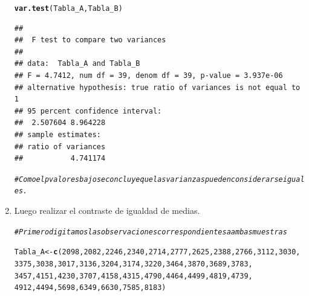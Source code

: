 \documentclass[12pt,letterpaper]{article}\usepackage[]{graphicx}\usepackage[]{color}
\makeatletter
\newcommand{\hlnum}[1]{\textcolor[rgb]{0.686,0.059,0.569}{#1}}%
\newcommand{\hlcom}[1]{\textcolor[rgb]{0.678,0.584,0.686}{\textit{#1}}}%
\newcommand{\hlstd}[1]{\textcolor[rgb]{0.345,0.345,0.345}{#1}}%
\newcommand{\hlkwb}[1]{\textcolor[rgb]{0.69,0.353,0.396}{#1}}%
\newcommand{\hlkwd}[1]{\textcolor[rgb]{0.737,0.353,0.396}{\textbf{#1}}}%
\newenvironment{kframe}{%
 \def\at@end@of@kframe{}%
 \ifinner\ifhmode%
  \def\at@end@of@kframe{\end{minipage}}%
  \begin{minipage}{\columnwidth}%
 \fi\fi%
 \def\FrameCommand##1{\hskip\@totalleftmargin \hskip-\fboxsep
 \colorbox{shadecolor}{##1}\hskip-\fboxsep
     \hskip-\linewidth \hskip-\@totalleftmargin \hskip\columnwidth}%
 \MakeFramed {\advance\hsize-\width
   \@totalleftmargin\z@ \linewidth\hsize
   \@setminipage}}%
 {\par\unskip\endMakeFramed%
 \at@end@of@kframe}
\newenvironment{knitrout}{}{} %
\makeatother
\begin{document}
\begin{enumerate}
\begin{knitrout}
\begin{kframe}
\begin{alltt}
\hlkwd{var.test}\hlstd{(Tabla_A, Tabla_B)}
\end{alltt}
\begin{verbatim}
## 
## 	F test to compare two variances
## 
## data:  Tabla_A and Tabla_B
## F = 4.7412, num df = 39, denom df = 39, p-value = 3.937e-06
## alternative hypothesis: true ratio of variances is not equal to 1
## 95 percent confidence interval:
##  2.507604 8.964228
## sample estimates:
## ratio of variances 
##           4.741174
\end{verbatim}
\begin{alltt}
\hlcom{# Como el p valor es bajo se concluye que las varianzas pueden considerarse iguales. }
\end{alltt}
\end{kframe}
\end{knitrout}

\item Luego realizar el contraste de igualdad de medias.

\begin{knitrout}
\color{fgcolor}\begin{kframe}
\begin{alltt}
\hlcom{# Primero digitamos las observaciones correspondientes a ambas muestras }

\hlstd{Tabla_A} \hlkwb{<-} \hlkwd{c}\hlstd{(}\hlnum{2098}\hlstd{,} \hlnum{2082}\hlstd{,} \hlnum{2246}\hlstd{,} \hlnum{2340}\hlstd{,} \hlnum{2714}\hlstd{,} \hlnum{2777}\hlstd{,} \hlnum{2625}\hlstd{,} \hlnum{2388}\hlstd{,} \hlnum{2766}\hlstd{,} \hlnum{3112}\hlstd{,} \hlnum{3030}\hlstd{,}
             \hlnum{3375}\hlstd{,} \hlnum{3038}\hlstd{,} \hlnum{3017}\hlstd{,} \hlnum{3136}\hlstd{,} \hlnum{3204}\hlstd{,} \hlnum{3174}\hlstd{,} \hlnum{3220}\hlstd{,} \hlnum{3464}\hlstd{,} \hlnum{3870}\hlstd{,} \hlnum{3689}\hlstd{,} \hlnum{3783}\hlstd{,}
             \hlnum{3457}\hlstd{,} \hlnum{4151}\hlstd{,} \hlnum{4230}\hlstd{,} \hlnum{3707}\hlstd{,} \hlnum{4158}\hlstd{,} \hlnum{4315}\hlstd{,} \hlnum{4790}\hlstd{,} \hlnum{4464}\hlstd{,} \hlnum{4499}\hlstd{,} \hlnum{4819}\hlstd{,} \hlnum{4739}\hlstd{,}
             \hlnum{4912}\hlstd{,} \hlnum{4494}\hlstd{,} \hlnum{5698}\hlstd{,} \hlnum{6349}\hlstd{,} \hlnum{6630}\hlstd{,} \hlnum{7585}\hlstd{,}\hlnum{8183}\hlstd{)}


\end{alltt}
\end{kframe}
\end{knitrout}
\end{enumerate}
\end{document}
